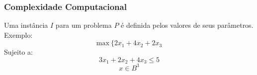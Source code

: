 \documentclass[fleqn]{beamer}
\begin{document}
\begin{frame}
	\frametitle{Complexidade Computacional}
	Uma instância $I$ para um problema $P$ é definida pelos valores de seus parâmetros. Exemplo:
	\begin{equation}
		\textrm{max}~\{2x_1 + 4x_2 + 2x_3
	\end{equation}
	Sujeito a:
	 \begin{equation}
		3x_1 +2x_2 + 4x_3 \leq 5
	\end{equation}
	\begin{equation}
		x \in B^3
	\end{equation}
\end{frame}
\end{document}
